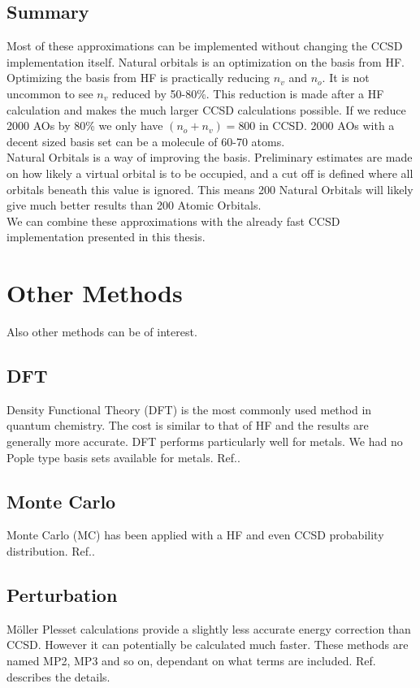 \documentclass[a4paper,norsk,11pt,twoside]{report}
\begin{document}
\subsection{Summary}

Most of these approximations can be implemented without changing the CCSD implementation itself. Natural orbitals is an optimization on the basis from HF. Optimizing the basis from HF is practically reducing $n_v$ and $n_o$. It is not uncommon to see $n_v$ reduced by 50-80\%. This reduction is made after a HF calculation and makes the much larger CCSD calculations possible. If we reduce 2000 AOs by 80\% we only have $(n_o + n_v) = 800$ in CCSD. 2000 AOs with a decent sized basis set can be a molecule of 60-70 atoms. \\

Natural Orbitals is a way of improving the basis. Preliminary estimates are made on how likely a virtual orbital is to be occupied, and a cut off is defined where all orbitals beneath this value is ignored. This means 200 Natural Orbitals will likely give much better results than 200 Atomic Orbitals. \\

We can combine these approximations with the already fast CCSD implementation presented in this thesis. 

\section{Other Methods}
Also other methods can be of interest. 

\subsection{DFT}
Density Functional Theory (DFT) is the most commonly used method in quantum chemistry. The cost is similar to that of HF and the results are generally more accurate. DFT performs particularly well for metals. We had no Pople type basis sets available for metals. Ref.\cite{dft_citation_urio}. 

\subsection{Monte Carlo}
Monte Carlo (MC) has been applied with a HF and even CCSD probability distribution. Ref.\cite{monte_carlo_citation_urio}. 

\subsection{Perturbation}
M\"oller Plesset calculations provide a slightly less accurate energy correction than CCSD. However it can potentially be calculated much faster. These methods are named MP2, MP3 and so on, dependant on what terms are included. Ref.\cite{hmeiding} describes the details. 
\end{document}
